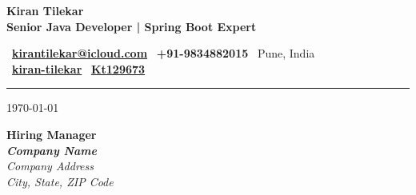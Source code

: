 \documentclass[10pt,a4paper]{article}
\begin{document}
\pagestyle{empty} %

\begin{center}
    {\Huge\bfseries\rmfamily\color{DarkPastelRed} Kiran Tilekar}\\[0.3cm]
    {\Large\bfseries\color{PastelRed} Senior Java Developer | Spring Boot Expert}\\[0.4cm]
    
    \colorbox{black!3}{%
        \begin{minipage}{0.95\textwidth}
            \centering
            \vspace{0.25cm}
            {\small\color{SlateGrey}
            \colorbox{PastelRed!10}{\color{DarkPastelRed}\faEnvelope\ \href{mailto:kirantilekar@icloud.com}{\textbf{kirantilekar@icloud.com}}} 
            \enspace\textbullet\enspace
            \colorbox{PastelRed!10}{\color{DarkPastelRed}\faPhone\ \textbf{+91-9834882015}}
            \enspace\textbullet\enspace
            \faMapMarker*\ Pune, India\\[0.2cm]
            \faLinkedin\ \href{https://linkedin.com/in/kiran-tilekar-94173382}{\textbf{kiran-tilekar}} 
            \enspace\textbullet\enspace
            \faGithub\ \href{https://github.com/Kt129673}{\textbf{Kt129673}}
            }
            \vspace{0.25cm}
        \end{minipage}
    }
\end{center}

\vspace{0.1cm}
\noindent\textcolor{GoldenEarth}{\rule{\textwidth}{1.5pt}}
\vspace{0.3cm}


\today

\vspace{0.3cm}

\noindent
\begin{minipage}{0.6\textwidth}
    {\color{DarkPastelRed}\textbf{Hiring Manager}}\\
    {\color{SlateGrey}\textbf{\textit{Company Name}}}\\
    {\color{LightGrey}\textit{Company Address}}\\
    {\color{LightGrey}\textit{City, State, ZIP Code}}
\end{minipage}
\end{document}
